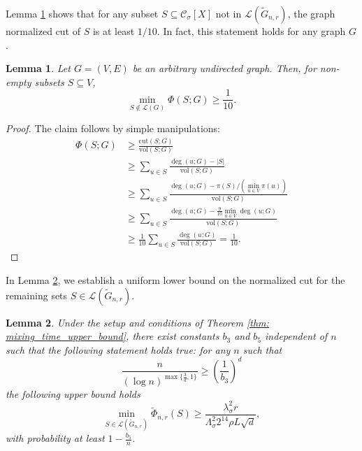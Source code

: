 \documentclass[11pt,twoside]{article}
\newtheorem{lemma}{Lemma}
\theoremstyle{definition}
\newcommand{\vol}{\mathrm{vol}}
\newcommand{\cut}{\mathrm{cut}}
\newcommand{\abs}[1]{\left \lvert #1 \right \rvert}
\newcommand{\1}{\mathbbm{1}}
\newcommand{\Xbf}{X}
\newcommand{\Cset}{\mathcal{C}}
\newcommand{\Csig}{\Cset_{\sigma}}
\begin{document}
Lemma \ref{lem: graph_conductance_profile_lb_1} shows that for any subset $S \subseteq \Csig[\Xbf]$ not in $\mathcal{L}(\widetilde{G}_{n,r})$, the graph normalized cut of $S$ is at least $1/10$. In fact, this statement holds for any graph $G$.
\begin{lemma}
	\label{lem: graph_conductance_profile_lb_1}
	Let $G = (V,E)$ be an arbitrary undirected graph. Then, for non-empty subsets $S \subseteq V$, 
	\begin{equation*}
	\min_{S \not\in \mathcal{L}(G)}\Phi(S; G) \geq \frac{1}{10}.
	\end{equation*}
\end{lemma}
\begin{proof}
	The claim follows by simple manipulations:
	\begin{align*}
	\Phi(S;G) & \geq \frac{\cut(S;G)}{\vol(S;G)} \\
	& \geq \sum_{u \in S} \frac{\deg(u;G) - \abs{S}}{\vol(S;G)} \\
	& \geq \sum_{u \in S} \frac{\deg(u;G) - \pi(S)/(\min_{u \in V}\pi(u))}{\vol(S;G)} \\
	& \geq \sum_{u \in S} \frac{\deg(u;G) - \frac{9}{10} \min_{u \in V}\deg(u;G)}{\vol(S;G)} \\
	& \geq \frac{1}{10} \sum_{u \in S} \frac{\deg(u;G)}{\vol(S;G)} = \frac{1}{10}.
	\end{align*}
\end{proof}

In Lemma \ref{lem: graph_conductance_profile_lb}, we establish a uniform lower bound on the normalized cut for the remaining sets $S \in \mathcal{L}(\widetilde{G}_{n,r})$. 

\begin{lemma}
	\label{lem: graph_conductance_profile_lb}
	Under the setup and conditions of Theorem \ref{thm: mixing_time_upper_bound}, there exist constants $b_3$ and $b_5$ independent of $n$ such that the following statement holds true: for any $n$ such that
	\begin{equation*}
	\frac{n}{(\log n)^{\max\{\frac{3}{d},1\}}} \geq \left(\frac{1}{b_3}\right)^d
	\end{equation*}
	the following upper bound holds
	\begin{equation}
	\label{eqn: graph_conductance_profile_lb}
	\min_{S \in \mathcal{L}(\widetilde{G}_{n,r})} \widetilde{\Phi}_{n,r}(S) \geq \frac{\lambda_{\sigma}^2 r}{\Lambda_{\sigma}^2 2^{14} \rho L \sqrt{d}},
	\end{equation}
	with probability at least $1 - \frac{b_5}{n}$. 
\end{lemma}
\end{document}
